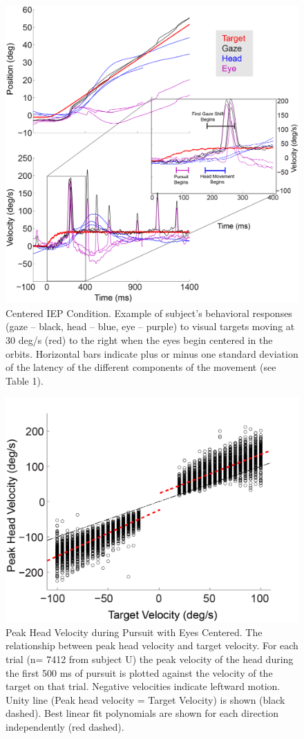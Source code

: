 \documentclass[12pt]{article}
\begin{document}
\begin{figure}[h]
\centering
\includegraphics[width=0.7\linewidth]{./figs/CenterIEP}
\caption[Gaze Pursuit with Eyes Centered]{Centered IEP Condition. Example of subject's behavioral responses (gaze – black, head – blue, eye – purple) to visual targets moving at 30 deg/s (red) to the right when the eyes begin centered in the orbits. Horizontal bars indicate plus or minus one standard deviation of the latency of the different components of the movement (see Table 1).
}
\label{fig:CenterIEP}
\end{figure}


\begin{figure}[h]
\centering
\includegraphics[width=0.7\linewidth]{./figs/CenterRegression}
\caption[Peak Head Velocity during Pursuit with Eyes Centered.]{Peak Head Velocity during Pursuit with Eyes Centered. The relationship between peak head velocity and target velocity. For each trial (n= 7412 from subject U) the peak velocity of the head during the first 500 ms of pursuit is plotted against the velocity of the target on that trial. Negative velocities indicate leftward motion. Unity line (Peak head velocity = Target Velocity) is shown (black dashed). Best linear fit polynomials are shown for each direction independently (red dashed).}
\label{fig:CenterRegression}
\end{figure}
\end{document}
